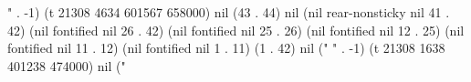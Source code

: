 " . -1) (t 21308 4634 601567 658000) nil (43 . 44) nil (nil rear-nonsticky nil 41 . 42) (nil fontified nil 26 . 42) (nil fontified nil 25 . 26) (nil fontified nil 12 . 25) (nil fontified nil 11 . 12) (nil fontified nil 1 . 11) (1 . 42) nil ("%
" . -1) (t 21308 1638 401238 474000) nil ("%

